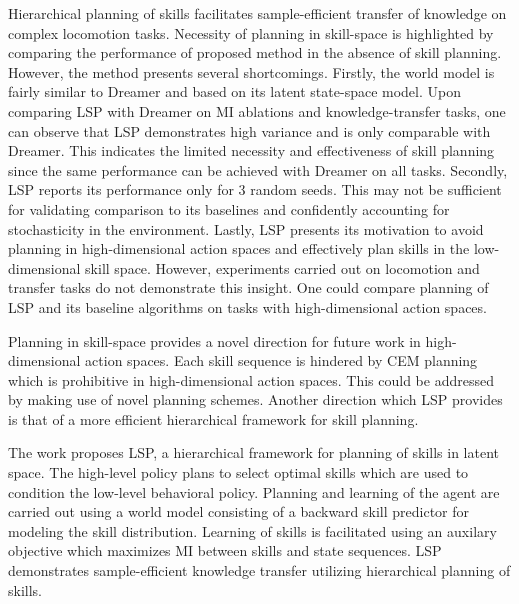 \documentclass[11pt,letterpaper]{article}
\begin{document}
Hierarchical planning of skills facilitates sample-efficient transfer of knowledge on complex locomotion tasks. Necessity of planning in skill-space is highlighted by comparing the performance of proposed method in the absence of skill planning. However, the method presents several shortcomings. Firstly, the world model is fairly similar to Dreamer and based on its latent state-space model. Upon comparing LSP with Dreamer on MI ablations and knowledge-transfer tasks, one can observe that LSP demonstrates high variance and is only comparable with Dreamer. This indicates the limited necessity and effectiveness of skill planning since the same performance can be achieved with Dreamer on all tasks. Secondly, LSP reports its performance only for 3 random seeds. This may not be sufficient for validating comparison to its baselines and confidently accounting for stochasticity in the environment. Lastly, LSP presents its motivation to avoid planning in high-dimensional action spaces and effectively plan skills in the low-dimensional skill space. However, experiments carried out on locomotion and transfer tasks do not demonstrate this insight. One could compare planning of LSP and its baseline algorithms on tasks with high-dimensional action spaces. 

Planning in skill-space provides a novel direction for future work in high-dimensional action spaces. Each skill sequence is hindered by CEM planning which is prohibitive in high-dimensional action spaces. This could be addressed by making use of novel planning schemes. Another direction which LSP provides is that of a more efficient hierarchical framework for skill planning. 

The work proposes LSP, a hierarchical framework for planning of skills in latent space. The high-level policy plans to select optimal skills which are used to condition the low-level behavioral policy. Planning and learning of the agent are carried out using a world model consisting of a backward skill predictor for modeling the skill distribution. Learning of skills is facilitated using an auxilary objective which maximizes MI between skills and state sequences. LSP demonstrates sample-efficient knowledge transfer utilizing hierarchical planning of skills.  
\end{document}
